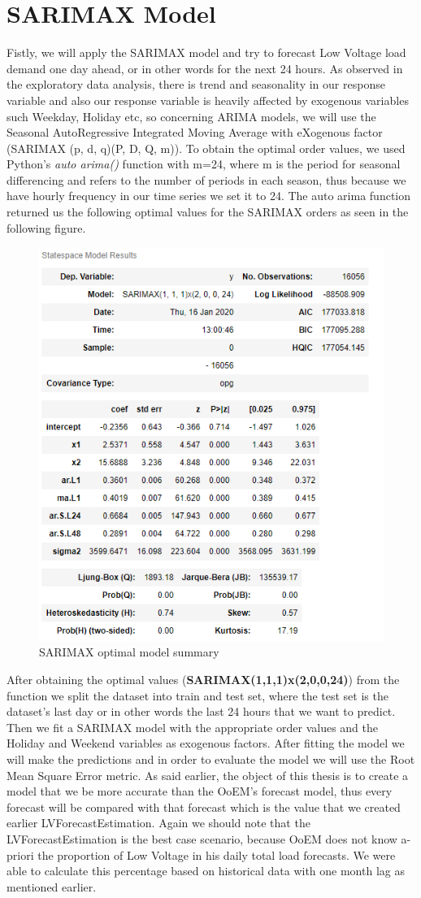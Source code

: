 \section{SARIMAX Model}
Fistly, we will apply the SARIMAX model and try to forecast Low Voltage load demand one day ahead, or in other words for the next 24 hours. As observed in the exploratory data analysis, there is trend and seasonality in our response variable and also our response variable is heavily affected by exogenous variables such Weekday, Holiday etc, so concerning ARIMA models, we will use the  Seasonal AutoRegressive Integrated Moving Average with eXogenous factor (SARIMAX (p, d, q)(P, D, Q, m)). To obtain the optimal order values, we used Python's \textit{auto arima()} \cite{autoarima} function with m=24, where m is the period for seasonal differencing and refers to the number of periods in each season, thus because we have hourly frequency in our time series we set it to 24. The auto arima function returned us the following optimal values for the SARIMAX orders as seen in the following figure.
\begin{figure}[h!]
\centering
\includegraphics[width=0.5\linewidth]{project/modelsum.PNG}
\caption{SARIMAX optimal model summary}
\label{fig:felix}
\end{figure}
After obtaining the optimal values (\textbf{SARIMAX(1,1,1)x(2,0,0,24)}) from the function we split the dataset into train and test set, where the test set is the dataset's last day or in other words the last 24 hours that we want to predict. Then we fit a SARIMAX model with the appropriate order values and the Holiday and Weekend variables as exogenous factors. After fitting the model we will make the predictions and in order to evaluate the model we will use the Root Mean Square Error metric.
As said earlier, the object of this thesis is to create a model that we be more accurate than the OoEM's forecast model, thus every forecast will be compared with that forecast which is the value that we created earlier LVForecastEstimation. Again we should note that the LVForecastEstimation is the best case scenario, because OoEM does not know a-priori the proportion of Low Voltage in his daily total load forecasts. We were able to calculate this percentage based on historical data with one month lag as mentioned earlier. 
